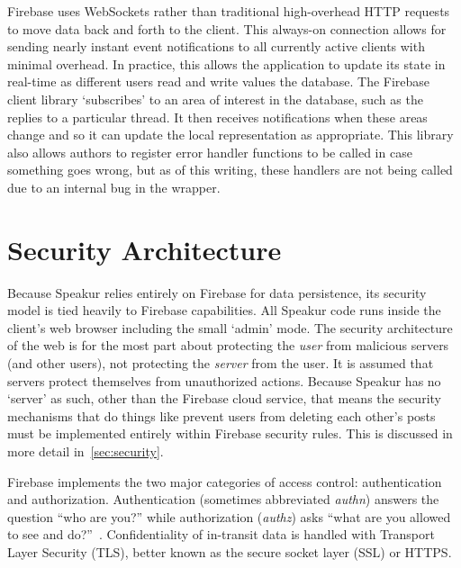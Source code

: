 Firebase uses WebSockets rather than traditional high-overhead HTTP requests to move data back and forth to the client.
This always-on connection allows for sending nearly instant event notifications to all currently active clients with minimal overhead.
In practice, this allows the application to update its state in real-time as different users read and write values the database.
The Firebase client library `subscribes' to an area of interest in the database, such as the replies to a particular thread.
It then receives notifications when these areas change and so it can update the local representation as appropriate.
This library also allows authors to register error handler functions to be called in case something goes wrong, but as of this writing, these handlers are not being called due to an internal bug in the  wrapper.

\section{Security Architecture}
\label{sec:arch_security}
Because Speakur relies entirely on Firebase for data persistence, its security model is tied heavily to Firebase capabilities. 
All Speakur code runs inside the client's web browser including the small `admin' mode.
The security architecture of the web is for the most part about protecting the \textit{user} from malicious servers (and other users), not protecting the \textit{server} from the user.
It is assumed that servers protect themselves from unauthorized actions.
Because Speakur has no `server' as such, 
other than the Firebase cloud service,
that means the security mechanisms that do things like prevent users from deleting each other's posts 
must be implemented entirely within Firebase security rules.
This is discussed in more detail in~\cref{sec:security}.

Firebase implements the two major categories of access control: authentication and 
authorization. 
Authentication (sometimes abbreviated \textit{authn}) answers the question ``who are you?'' 
while authorization (\textit{authz}) asks ``what are you allowed to see and do?''~\cite{stallings2011}.
Confidentiality of in-transit data is handled with Transport Layer Security (TLS), 
better known as the secure socket layer (SSL) or HTTPS.

